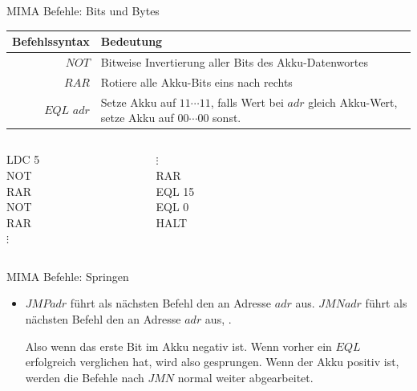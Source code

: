 \begin{frame}{MIMA Befehle: Bits und Bytes }
	\begin{tabular}{r | p{8cm} }
		Befehlssyntax & Bedeutung\\\hline\hline 
		$NOT$ & Bitweise Invertierung aller Bits des Akku-Datenwortes\\\hline
		$RAR$ & Rotiere alle Akku-Bits eins nach rechts\\\hline
		$EQL$ $adr$ & Setze Akku auf $11\cdots11$, falls Wert bei $adr$ gleich Akku-Wert, setze Akku auf $00\cdots00$ sonst.\\\hline
	\end{tabular}
	
	\bp 
	\vspace{.5cm}
	\vspace{.2cm}
	
	\begin{columns}
		\begin{column}{0.25\textwidth}
			LDC 5 \\ NOT \\ RAR \\ NOT \\ RAR \\ $\vdots$
		\end{column}
		\begin{column}{0.25\textwidth}
			$\vdots$ \\ RAR \\ EQL 15 \\ EQL 0 \\ HALT
		\end{column}
		
		\begin{column}{0.5\textwidth}
		\end{column}
	\end{columns}
\end{frame}

\begin{frame}{MIMA Befehle: Springen}
	\begin{itemize}
		\pitem Normalerweise wird die Instruktionsadresse nach jedem Befehl um eins erhöht
		\pitem Also Befehle werden von oben nach unten abgearbeitet
		\pitem Mit Sprüngen kann man die MIMA zwingen, zu definiertem Befehl zu springen und damit die Vorgehensreihenfolge zu beeinflussen
		
		\vspace{.3cm} \bp
		
		\item $JMP adr$ führt als nächsten Befehl den an Adresse $adr$ aus.
		\pitem $JMN adr$ führt als nächsten Befehl den an Adresse $adr$ aus, .
		\begin{itemize}
			\pitem Also wenn das erste Bit im Akku negativ ist.
			\pitem Wenn vorher ein $EQL$ erfolgreich verglichen hat, wird also gesprungen.
			\pitem Wenn der Akku positiv ist, werden die Befehle nach $JMN$ normal weiter abgearbeitet.
		\end{itemize}
	\end{itemize}
\end{frame}
	
